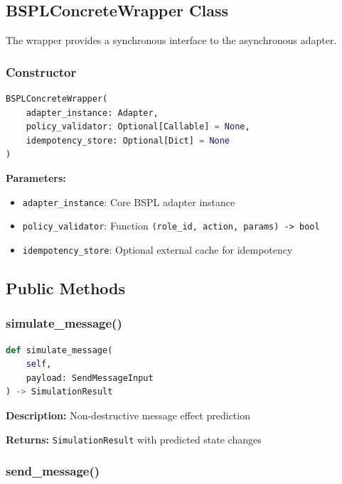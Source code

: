 \documentclass[11pt,a4paper]{article}
\begin{document}
\subsection{BSPLConcreteWrapper Class}

The wrapper provides a synchronous interface to the asynchronous adapter.

\subsubsection{Constructor}

\begin{lstlisting}[language=Python]
BSPLConcreteWrapper(
    adapter_instance: Adapter,
    policy_validator: Optional[Callable] = None,
    idempotency_store: Optional[Dict] = None
)
\end{lstlisting}

\textbf{Parameters:}
\begin{itemize}
    \item \texttt{adapter\_instance}: Core BSPL adapter instance
    \item \texttt{policy\_validator}: Function \texttt{(role\_id, action, params) -> bool}
    \item \texttt{idempotency\_store}: Optional external cache for idempotency
\end{itemize}

\subsection{Public Methods}

\subsubsection{simulate\_message()}

\begin{lstlisting}[language=Python]
def simulate_message(
    self,
    payload: SendMessageInput
) -> SimulationResult
\end{lstlisting}

\textbf{Description:} Non-destructive message effect prediction

\textbf{Returns:} \texttt{SimulationResult} with predicted state changes

\subsubsection{send\_message()}
\end{document}
